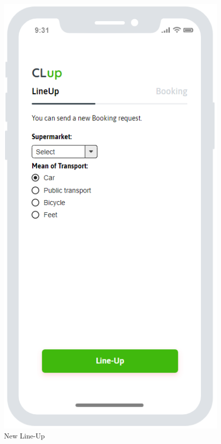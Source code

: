 \begin{figure}[H]
\begin{minipage}{0.3\linewidth} 
\includegraphics[width=\textwidth]{./Images/MockupLogo/mockLineUpNew}
\caption{New Line-Up}
\end{minipage}
\end{figure}
